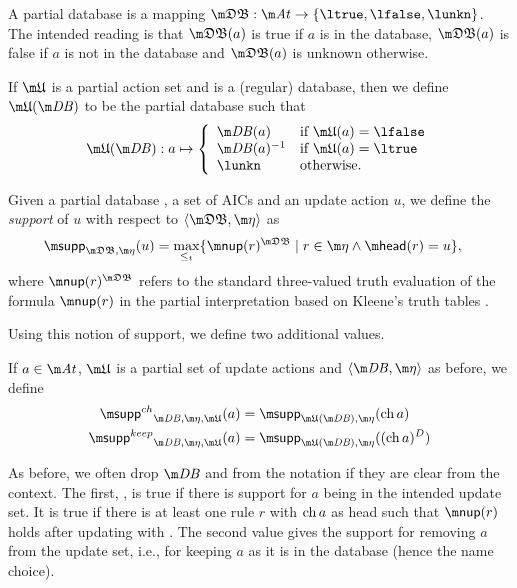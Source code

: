 A partial database is a mapping $\tdb: \atoms \to \{\ltrue,\lfalse,\lunkn\}$.
The intended reading is that $\tdb(a)$ is true if $a$ is in the database, $\tdb(a)$ is false if $a$ is not in the database and $\tdb(a)$ is unknown otherwise. 

If $\UUU$ is a partial action set and \db is a (regular) database, then we define $\UUU(\db)$ to be the partial database such that 
\[ \UUU(\db): a \mapsto \left \{\begin{array}{ll}
                                 \db(a) & \text{if }\UUU(a) = \lfalse\\
                                 \db(a)^{-1} & \text{if }\UUU(a) = \ltrue\\
                                 \lunkn & \text{otherwise.}
                                \end{array}\right.
                                \]



\begin{definition}\label{def:support}
Given a partial database \tdb, a set of AICs \aics and an update action $u$,  we define the \emph{support} of $u$ with respect to $\langle \tdb, \aics\rangle$ as 
\begin{align*}
 \supp_{\tdb,\aics}(u) &= \max_{\leq_t}\{\nup(r)^{\tdb}\mid r\in \aics \land \head(r) = u\},
\end{align*}
where $\nup(r)^{\tdb}$ refers to the standard three-valued truth evaluation of the formula $\nup(r)$ in the partial interpretation \tdb based on Kleene's truth tables \cite{Kleene38}.
\end{definition}

Using this notion of support, we define two additional values. 

\begin{definition}
If $a\in \atoms$, $\UUU$ is a partial set of update actions and $\langle \db, \aics\rangle$ as before, we define 
\begin{align*}
 \suppin_{\db,\aics,\UUU}(a) &= \supp_{\UUU(\db), \aics}(\change a)\\
  \suppout_{\db,\aics,\UUU}(a) &= \supp_{\UUU(\db), \aics}((\change a)^D)
\end{align*}
\end{definition}
As before, we often drop $\db$ and \aics from the notation if they are clear from the context. 
The first, \suppin, is true if there is support for $a$ being in the intended update set. It is true if there is at least one rule $r$ with $\operatorname{ch} a$ as head such that $\nup(r)$ holds after updating \db with \UUU. The second value gives the support for removing $a$ from the update set, i.e., for keeping $a$ as it is in the database (hence the name choice). 






